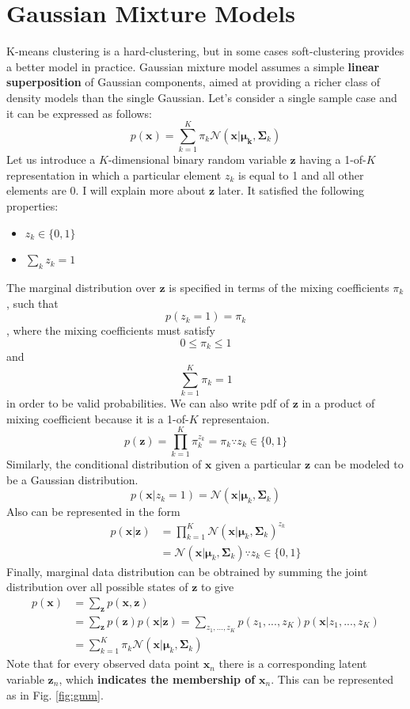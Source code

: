 \section{Gaussian Mixture Models}
K-means clustering is a hard-clustering, but in some cases soft-clustering provides a better model in practice. Gaussian mixture model assumes a simple \textbf{linear superposition} of Gaussian components, aimed at providing a richer class of density models than the single Gaussian. Let's consider a single sample case and it can be expressed as follows:
$$p(\mathbf{x})= \sum_{k=1}^{K}\pi_k\mathcal{N}(\mathbf{x}|\boldsymbol{\mu_k}, \boldsymbol{\Sigma}_k)$$
Let us introduce a $K$-dimensional binary random variable $\mathbf{z}$ having a 1-of-$K$ representation in which a particular element $z_k$ is equal to 1 and all other elements are 0. I will explain more about $\mathbf{z}$ later. It satisfied the following properties:
\begin{itemize}
	\item $z_k\in\{0,1\}$
	\item $\sum_kz_k=1$
\end{itemize}
The marginal distribution over $\mathbf{z}$ is specified in terms of the mixing coefficients $\pi_k$, such that 
$$p(z_k=1) = \pi_k$$
, where the mixing coefficients must satisfy
$$0\leq\pi_k\leq1$$
and 
$$\sum_{k=1}^{K}\pi_k = 1 $$
in order to be valid probabilities. We can also write pdf of $\mathbf{z}$ in a product of mixing coefficient because it is a 1-of-$K$ representaion.
$$p(\mathbf{z}) = \prod_{k=1}^{K}\pi_k^{z_k} = \pi_k \because z_k\in\{
0,1\}$$
Similarly, the conditional distribution of $\mathbf{x}$ given a particular $\mathbf{z}$ can be modeled to be a Gaussian distribution.
\begin{equation*}
p(\mathbf{x}|z_k=1) = \mathcal{N}(\mathbf{x}|\boldsymbol{\mu}_k, \boldsymbol{\Sigma}_k) 
\end{equation*}
Also can be represented in the form 
\begin{align*}
p(\mathbf{x}|\mathbf{z}) &= \prod_{k=1}^{K}\mathcal{N}(\mathbf{x}|\boldsymbol{\mu}_k, \boldsymbol{\Sigma}_k)^{z_k}\\
& = \mathcal{N}(\mathbf{x}|\boldsymbol{\mu}_k, \boldsymbol{\Sigma}_k) \because z_k\in\{
0,1\}
\end{align*}
Finally, marginal data distribution can be obtrained by summing the joint distribution over all possible states of $\mathbf{z}$ to give
\begin{align*}
	p(\mathbf{x}) &  = \sum_{\mathbf{z}} p(\mathbf{x},\mathbf{z})\\
	& = \sum_{\mathbf{z}} p(\mathbf{z})p(\mathbf{x}|\mathbf{z})= \sum_{z_1,...,z_K} p(z_1,...,z_K)p(\mathbf{x}|z_1,...,z_K)\\
	& = \sum_{k=1}^{K}\pi_k \mathcal{N}(\mathbf{x}|\boldsymbol{\mu}_k, \boldsymbol{\Sigma}_k) 
\end{align*}
Note that for every observed data point $\mathbf{x}_n$ there is a corresponding latent variable $\mathbf{z}_n$, which \textbf{indicates the membership of} $\mathbf{x}_n$. This can be represented as in Fig. \ref{fig:gmm}.

